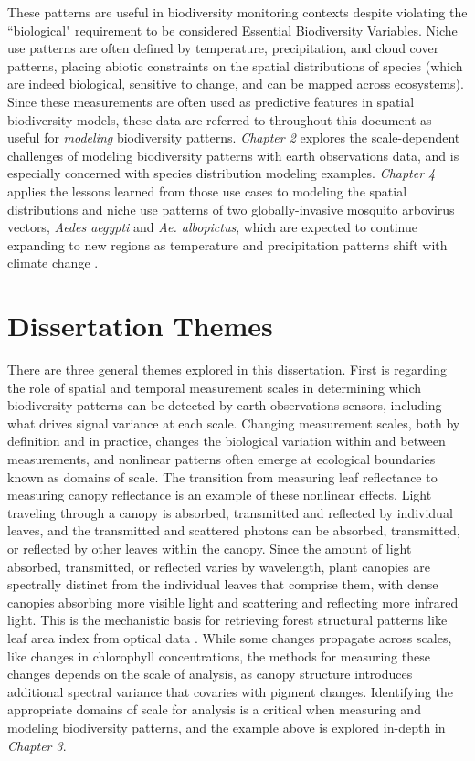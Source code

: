 These patterns are useful in biodiversity monitoring contexts despite violating the ``biological" requirement to be considered Essential Biodiversity Variables. Niche use patterns are often defined by temperature, precipitation, and cloud cover patterns, placing abiotic constraints on the spatial distributions of species (which are indeed biological, sensitive to change, and can be mapped across ecosystems). Since these measurements are often used as predictive features in spatial biodiversity models, these data are referred to throughout this document as useful for \textit{modeling} biodiversity patterns. \textit{Chapter 2} explores the scale-dependent challenges of modeling biodiversity patterns with earth observations data, and is especially concerned with species distribution modeling examples. \textit{Chapter 4} applies the lessons learned from those use cases to modeling the spatial distributions and niche use patterns of two globally-invasive mosquito arbovirus vectors, \textit{Aedes aegypti} and \textit{Ae. albopictus}, which are expected to continue expanding to new regions as temperature and precipitation patterns shift with climate change \cite{Tjaden2018-zi, Ryan2019-pz}.

\section{Dissertation Themes}

There are three general themes explored in this dissertation. First is regarding the role of spatial and temporal measurement scales in determining which biodiversity patterns can be detected by earth observations sensors, including what drives signal variance at each scale. Changing measurement scales, both by definition and in practice, changes the biological variation within and between measurements, and nonlinear patterns often emerge at ecological boundaries known as domains of scale. The transition from measuring leaf reflectance to measuring canopy reflectance is an example of these nonlinear effects. Light traveling through a canopy is absorbed, transmitted and reflected by individual leaves, and the transmitted and scattered photons can be absorbed, transmitted, or reflected by other leaves within the canopy. Since the amount of light absorbed, transmitted, or reflected varies by wavelength, plant canopies are spectrally distinct from the individual leaves that comprise them, with dense canopies absorbing more visible light and scattering and reflecting more infrared light. This is the mechanistic basis for retrieving forest structural patterns like leaf area index from optical data \cite{Jordan1969-ol}. While some changes propagate across scales, like changes in chlorophyll concentrations, the methods for measuring these changes depends on the scale of analysis, as canopy structure introduces additional spectral variance that covaries with pigment changes. Identifying the appropriate domains of scale for analysis is a critical when measuring and modeling biodiversity patterns, and the example above is explored in-depth in \textit{Chapter 3}.

